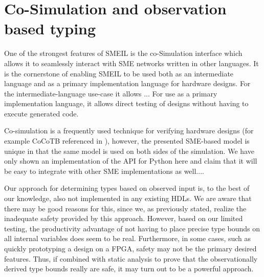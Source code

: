 


\section{Co-Simulation and observation based typing}
One of the strongest features of SMEIL is the co-Simulation interface which
allows it to seamlessly interact with SME networks written in other
languages. It is the cornerstone of enabling SMEIL to be used both as an
intermediate language and as a primary implementation language for hardware
designs. For the intermediate-language use-case it allows ... For use as a
primary implementation language, it allows direct testing of designs without
having to execute generated code.

Co-simulation is a frequently used technique for verifying hardware designs (for
example CoCoTB referenced in ), however, the presented
SME-based model is unique in that the same model is used on both sides of the
simulation. We have only shown an implementation of the API for Python here and
claim that it will be easy to integrate with other SME implementations as
well....

Our approach for determining types based on observed input is, to the best of
our knowledge, also not implemented in any existing HDLs. We are aware that
there may be good reasons for this, since we, as previously stated, realize the
inadequate safety provided by this approach. However, based on our limited
testing, the productivity advantage of not having to place precise type bounds
on all internal variables does seem to be real. Furthermore, in some cases, such
as quickly prototyping a design on a FPGA, safety may not be the primary desired
features. Thus, if combined with static analysis to prove that the
observationally derived type bounds really are safe, it may turn out to be a
powerful approach.

